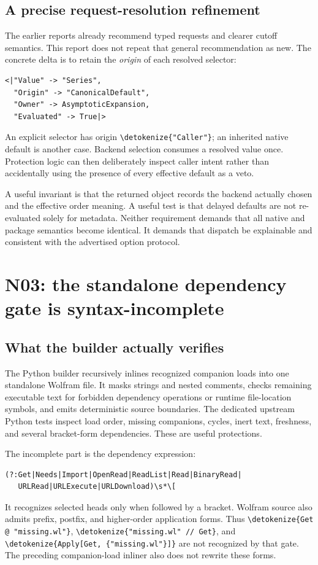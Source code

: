 \documentclass[11pt,a4paper]{article}
\newcommand{\wl}[1]{\texttt{\expandafter\nolinkurl\expandafter{\detokenize{#1}}}}
\begin{document}
\subsection{A precise request-resolution refinement}

The earlier reports already recommend typed requests and clearer cutoff
semantics. This report does not repeat that general recommendation as new.
The concrete delta is to retain the \emph{origin} of each resolved selector:
\begin{lstlisting}
<|"Value" -> "Series",
  "Origin" -> "CanonicalDefault",
  "Owner" -> AsymptoticExpansion,
  "Evaluated" -> True|>
\end{lstlisting}
An explicit selector has origin \wl{"Caller"}; an inherited native default is
another case. Backend selection consumes a resolved value once. Protection
logic can then deliberately inspect caller intent rather than accidentally
using the presence of every effective default as a veto.

A useful invariant is that the returned object records the backend actually
chosen and the effective order meaning. A useful test is that delayed defaults
are not re-evaluated solely for metadata. Neither requirement demands that all
native and package semantics become identical. It demands that dispatch be
explainable and consistent with the advertised option protocol.

\section{N03: the standalone dependency gate is syntax-incomplete}\label{sec:builder}

\subsection{What the builder actually verifies}

The Python builder recursively inlines recognized companion loads into one
standalone Wolfram file. It masks strings and nested comments, checks remaining
executable text for forbidden dependency operations or runtime file-location
symbols, and emits deterministic source boundaries. The dedicated upstream
Python tests inspect load order, missing companions, cycles, inert text,
freshness, and several bracket-form dependencies. These are useful protections.
\cite{builder,buildtests}

The incomplete part is the dependency expression:
\begin{lstlisting}
(?:Get|Needs|Import|OpenRead|ReadList|Read|BinaryRead|
   URLRead|URLExecute|URLDownload)\s*\[
\end{lstlisting}
It recognizes selected heads only when followed by a bracket. Wolfram source
also admits prefix, postfix, and higher-order application forms. Thus
\wl{Get @ "missing.wl"}, \wl{"missing.wl" // Get}, and
\wl{Apply[Get, {"missing.wl"}]} are not recognized by that gate. The preceding
companion-load inliner also does not rewrite these forms.\cite{builder,wlexpressions,wlapply}
\end{document}
